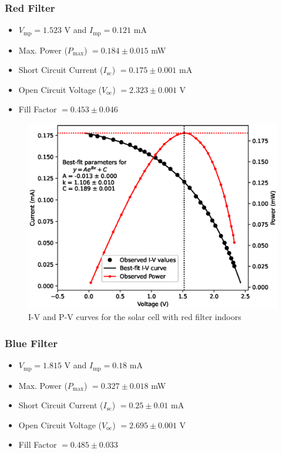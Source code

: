 
\subsubsection{Red Filter}
\begin{itemize}
    \item $V_\text{mp} = 1.523$ V and $I_\text{mp} = 0.121$ mA
    \item Max. Power ($P_\text{max}$) $= 0.184 \pm 0.015 $ mW
    \item Short Circuit Current ($I_\text{sc}$) $= 0.175 \pm 0.001$ mA
    \item Open Circuit Voltage ($V_\text{oc}$) $= 2.323 \pm 0.001$ V
    \item Fill Factor $= 0.453 \pm 0.046$
\end{itemize}

\begin{figure}[H]
    \centering
    \includegraphics[width=1\columnwidth]{images/in/red.eps}
    \caption{I-V and P-V curves for the solar cell with red filter indoors}
\end{figure}


\subsubsection{Blue Filter}
\begin{itemize}
    \item $V_\text{mp} = 1.815$ V and $I_\text{mp} = 0.18$ mA
    \item Max. Power ($P_\text{max}$) $= 0.327 \pm 0.018 $ mW
    \item Short Circuit Current ($I_\text{sc}$) $= 0.25 \pm 0.01$ mA
    \item Open Circuit Voltage ($V_\text{oc}$) $= 2.695 \pm 0.001$ V
    \item Fill Factor $= 0.485 \pm 0.033$
\end{itemize}

